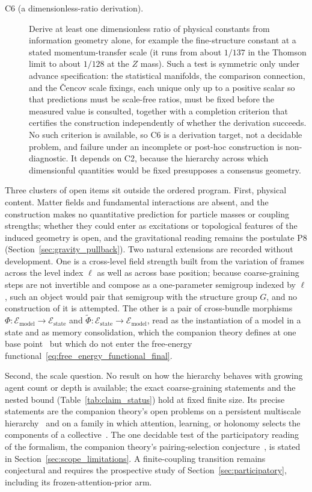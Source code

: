 \documentclass[11pt]{article}
\begin{document}
\begin{description}
\item[C6 (a dimensionless-ratio derivation).] Derive at least one dimensionless ratio of physical constants from information geometry alone, for example the fine-structure constant at a stated momentum-transfer scale (it runs from about $1/137$ in the Thomson limit to about $1/128$ at the $Z$ mass). Such a test is symmetric only under advance specification: the statistical manifolds, the comparison connection, and the \v{C}encov scale fixings, each unique only up to a positive scalar so that predictions must be scale-free ratios, must be fixed before the measured value is consulted, together with a completion criterion that certifies the construction independently of whether the derivation succeeds. No such criterion is available, so C6 is a derivation target, not a decidable problem, and failure under an incomplete or post-hoc construction is non-diagnostic. It depends on C2, because the hierarchy across which dimensionful quantities would be fixed presupposes a consensus geometry.
\end{description}

Three clusters of open items sit outside the ordered program. First, physical content. Matter fields and fundamental interactions are absent, and the construction makes no quantitative prediction for particle masses or coupling strengths; whether they could enter as excitations or topological features of the induced geometry is open, and the gravitational reading remains the postulate P8 (Section~\ref{sec:gravity_pullback}). Two natural extensions are recorded without development. One is a cross-level field strength built from the variation of frames across the level index $\ell$ as well as across base position; because coarse-graining steps are not invertible and compose as a one-parameter semigroup indexed by $\ell$, such an object would pair that semigroup with the structure group $G$, and no construction of it is attempted. The other is a pair of cross-bundle morphisms $\Phi: \mathcal{E}_{\mathrm{model}} \to \mathcal{E}_{\mathrm{state}}$ and $\tilde{\Phi}: \mathcal{E}_{\mathrm{state}} \to \mathcal{E}_{\mathrm{model}}$, read as the instantiation of a model in a state and as memory consolidation, which the companion theory defines at one base point~\cite[Ch.~2]{DennisGaugeVFE2026} but which do not enter the free-energy functional~\eqref{eq:free_energy_functional_final}.

Second, the scale question. No result on how the hierarchy behaves with growing agent count or depth is available; the exact coarse-graining statements and the nested bound (Table~\ref{tab:claim_status}) hold at fixed finite size. Its precise statements are the companion theory's open problems on a persistent multiscale hierarchy~\cite[Ch.~12]{DennisGaugeVFE2026} and on a family in which attention, learning, or holonomy selects the components of a collective~\cite[Ch.~13]{DennisGaugeVFE2026}. The one decidable test of the participatory reading of the formalism, the companion theory's pairing-selection conjecture~\cite[Ch.~14]{DennisGaugeVFE2026}, is stated in Section~\ref{sec:scope_limitations}. A finite-coupling transition remains conjectural and requires the prospective study of Section~\ref{sec:participatory}, including its frozen-attention-prior arm.
\end{document}
